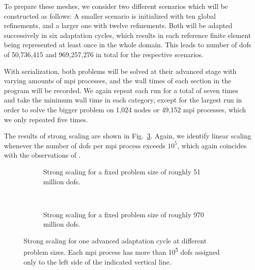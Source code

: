 To prepare these meshes, we consider two different scenarios which will be constructed as follows: A smaller scenario is initialized with ten global refinements, and a larger one with twelve refinements. Both will be adapted successively in six adaptation cycles, which results in each reference finite element being represented at least once in the whole domain. This leads to number of \glspl{dof} of 50,736,415 and 969,257,276 in total for the respective scenarios.

With serialization, both problems will be solved at their advanced stage with varying amounts of \gls{mpi} processes, and the wall times of each section in the program will be recorded. We again repeat each run for a total of seven times and take the minimum wall time in each category, except for the largest run in order to solve the bigger problem on 1,024 nodes or 49,152 \gls{mpi} processes, which we only repeated five times. %

The results of strong scaling are shown in Fig.~\ref{fig:strong}.
Again, we identify linear scaling whenever the number of \glspl{dof} per \gls{mpi} process exceeds $10^5$, which again coincides with the observations of \textcite{bangerth2012}.

\begin{figure}
\begin{subfigure}{1\textwidth}
  \centering
  
  \caption{Strong scaling for a fixed problem size of roughly 51 million \glspl{dof}.}
  \label{fig:strong-nrefs10}
\end{subfigure} \\
\vspace{1em}
\begin{subfigure}{1\textwidth}
  \centering
  
  \caption{Strong scaling for a fixed problem size of roughly 970 million \glspl{dof}.}
  \label{fig:strong-nrefs12}
\end{subfigure}
\caption[Strong scaling for one advanced adaptation cycle at different problem sizes.]{Strong scaling for one advanced adaptation cycle at different problem sizes. Each \gls{mpi} process has more than 10\textsuperscript{5} \glspl{dof} assigned only to the left side of the indicated vertical line.}
\label{fig:strong}
\end{figure}